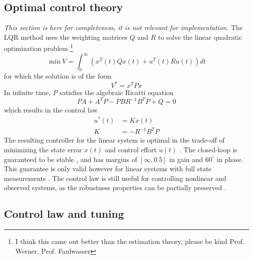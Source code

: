 \subsection{Optimal control theory}
\label{sec:controller-theory}
\textit{This section is here for completeness, it is not relevant for implementation.}
The LQR method uses the weighting matrices $Q$ and $R$ to solve the linear quadratic optimization problem \cite{werner2021b} \footnote{I think this came out better than the estimation theory, please be kind Prof. Werner, Prof. Faulwasser}
\begin{equation}
    \min V = \int_0^{\infty} (x^T(t) Q x(t) + u^T(t) R u(t)) dt
\end{equation}
for which the solution is of the form 
\begin{equation}
    V^* = x^T P x
\end{equation}
In infinite time, $P$ satisfies the algebraic Ricatti equation 
\begin{equation}
    PA + A^TP - PBR^{-1}B^TP + Q = 0
\end{equation}
which results in the control law
\begin{align}
    u^*(t) &= K x(t) \\
    K &= -R^{-1}B^TP
\end{align}
The resulting controller for the linear system is optimal in the trade-off of minimizing the state error $x(t)$ and control effort $u(t)$ \cite{werner2021}.
The closed-loop is guaranteed to be stable \cite{werner2021b}, and has margins of $[\infty, 0.5]$ in gain and $60^\circ$ in phase. 
This guarantee is only valid however for linear systems with full state measurements \cite{doyle1978}.
The control law is still useful for controlling nonlinear and observed systems, as the robustness properties can be partially preserved \cite{werner2021b}.


\subsection{Control law and tuning}

